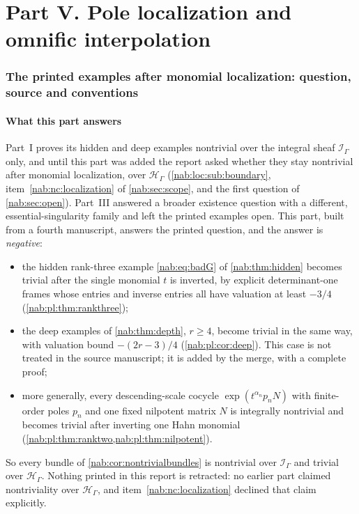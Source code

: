 \documentclass[11pt,letterpaper]{article}
\theoremstyle{definition}
\theoremstyle{remark}
\newcommand{\HH}{\mathscr H_\Gamma}
\newcommand{\II}{\mathscr I_\Gamma}
\numberwithin{equation}{section}
\begin{document}
\part*{Part V. Pole localization and omnific interpolation}

\section{The printed examples after monomial localization: question, source and
conventions}\label{nab:pl:sec:intro}

\subsection{What this part answers}\label{nab:pl:sub:answer}

Part~I proves its hidden and deep examples nontrivial over the integral sheaf
$\II$ only, and until this part was added the report asked whether they stay
nontrivial after monomial localization, over $\HH$
(\cref{nab:loc:sub:boundary}, item~\ref{nab:nc:localization} of
\cref{nab:sec:scope}, and the first question of \cref{nab:sec:open}). Part~III
answered a broader existence question with a different, essential-singularity
family and left the printed examples open. This part, built from a fourth
manuscript, answers the printed question, and the answer is \emph{negative}:
\begin{itemize}
\item the hidden rank-three example \eqref{nab:eq:badG} of
\cref{nab:thm:hidden} becomes trivial after the single monomial $t$ is
inverted, by explicit determinant-one frames whose entries and inverse entries
all have valuation at least $-3/4$ (\cref{nab:pl:thm:rankthree});
\item the deep examples of \cref{nab:thm:depth}, $r\geq4$, become trivial in
the same way, with valuation bound $-(2r-3)/4$
(\cref{nab:pl:cor:deep}). This case is not treated in the source manuscript; it
is added by the merge, with a complete proof;
\item more generally, every descending-scale cocycle
$\exp(t^{\alpha_n}p_nN)$ with finite-order poles $p_n$ and one fixed nilpotent
matrix $N$ is integrally nontrivial and becomes trivial after inverting one
Hahn monomial (\cref{nab:pl:thm:ranktwo,nab:pl:thm:nilpotent}).
\end{itemize}
So every bundle of \cref{nab:cor:nontrivialbundles} is nontrivial over $\II$
and trivial over $\HH$. Nothing printed in this report is retracted: no
earlier part claimed nontriviality over $\HH$, and item~\ref{nab:nc:localization}
declined that claim explicitly.
\end{document}

